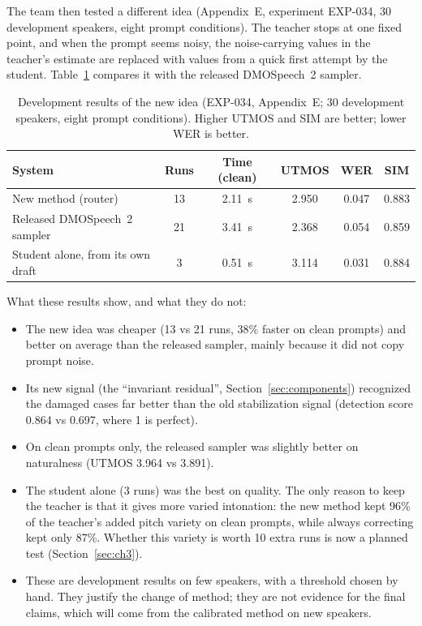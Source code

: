 \documentclass[11pt,a4paper]{article}
\begin{document}
The team then tested a different idea (Appendix~E, experiment EXP-034, 30 development speakers, eight prompt conditions). The teacher stops at one fixed point, and when the prompt seems noisy, the noise-carrying values in the teacher's estimate are replaced with values from a quick first attempt by the student. Table~\ref{tab:exp034} compares it with the released DMOSpeech~2 sampler.

\begin{table}[H]
\centering\small
\caption{Development results of the new idea (EXP-034, Appendix~E; 30 development speakers, eight prompt conditions). Higher UTMOS and SIM are better; lower WER is better.}
\label{tab:exp034}
\begin{tabular}{@{}lccccc@{}}
\toprule
\textbf{System} & \textbf{Runs} & \textbf{Time (clean)} & \textbf{UTMOS} & \textbf{WER} & \textbf{SIM} \\
\midrule
New method (router) & 13 & 2.11~s & 2.950 & 0.047 & 0.883 \\
Released DMOSpeech~2 sampler & 21 & 3.41~s & 2.368 & 0.054 & 0.859 \\
Student alone, from its own draft & 3 & 0.51~s & 3.114 & 0.031 & 0.884 \\
\bottomrule
\end{tabular}
\end{table}

What these results show, and what they do not:
\begin{itemize}
\item The new idea was cheaper (13 vs 21 runs, 38\% faster on clean prompts) and better on average than the released sampler, mainly because it did not copy prompt noise.
\item Its new signal (the ``invariant residual'', Section~\ref{sec:components}) recognized the damaged cases far better than the old stabilization signal (detection score 0.864 vs 0.697, where 1 is perfect).
\item On clean prompts only, the released sampler was slightly better on naturalness (UTMOS 3.964 vs 3.891).
\item The student alone (3 runs) was the best on quality. The only reason to keep the teacher is that it gives more varied intonation: the new method kept 96\% of the teacher's added pitch variety on clean prompts, while always correcting kept only 87\%. Whether this variety is worth 10 extra runs is now a planned test (Section~\ref{sec:ch3}).
\item These are development results on few speakers, with a threshold chosen by hand. They justify the change of method; they are not evidence for the final claims, which will come from the calibrated method on new speakers.
\end{itemize}
\end{document}
